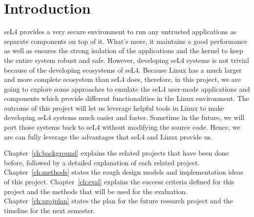 \chapter{Introduction}\label{ch:intro}

seL4 provides a very secure environment to run any untrusted applications as separate components on top of it. What's more, it maintains a good performance as well as ensures the strong isolation of the applications and the kernel to keep the entire system robust and safe. However, developing seL4 systems is not trivial because of the developing ecosystems of seL4. Because Linux has a much larger and more complete ecosystem than seL4 does, therefore, in this project, we are going to explore some approaches to emulate the seL4 user-mode applications and components which provide different functionalities in the Linux environment. The outcome of this project will let us leverage helpful tools in Linux to make developing seL4 systems much easier and faster. Sometime in the future, we will port those systems back to seL4 without modifying the source code. Hence, we are can fully leverage the advantages that seL4 and Linux provide us.

Chapter~\ref{ch:background} explains the related projects that have been done before, followed by a detailed explanation of each related project.
Chapter~\ref{ch:methods} states the rough design models and implementation ideas of this project.
Chapter~\ref{ch:eval} explains the success criteria defined for this project and the methods that will be used for the evaluation.
Chapter~\ref{ch:projplan} states the plan for the future research project and the timeline for the next semester.